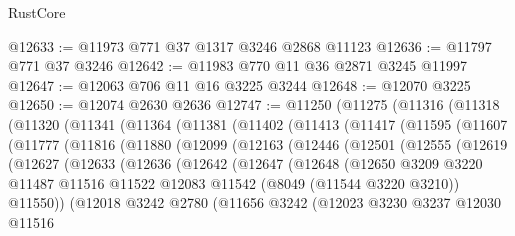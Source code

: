 \begin{lexlean}{RustCore}
\begin{coremodule}
@12633 := @11973 @771 @37 @1317 @3246 @2868 @11123
@12636 := @11797 @771 @37 @3246
@12642 := @11983 @770 @11 @36 @2871 @3245 @11997
@12647 := @12063 @706 @11 @16 @3225 @3244
@12648 := @12070 @3225
@12650 := @12074 @2630 @2636
@12747 := @11250
    (@11275
      (@11316
        (@11318
          (@11320
            (@11341
              (@11364
                (@11381
                  (@11402
                    (@11413
                      (@11417
                        (@11595
                          (@11607
                            (@11777
                              (@11816
                                (@11880
                                  (@12099
                                    (@12163
                                      (@12446
                                        (@12501
                                          (@12555
                                            (@12619
                                              (@12627
                                                (@12633
                                                  (@12636
                                                    (@12642
                                                      (@12647
                                                        (@12648
                                                          (@12650
                                                            @3209
                                                            @3220
                                                            @11487
                                                            @11516
                                                            @11522
                                                            @12083
                                                            @11542
                                                            (@8049 (@11544 @3220 @3210))
                                                            @11550))
                                                        (@12018
                                                          @3242
                                                          @2780
                                                          (@11656
                                                            @3242
                                                            (@12023
                                                              @3230
                                                              @3237
                                                              @12030
                                                              @11516

\end{coremodule}
\end{lexlean}
